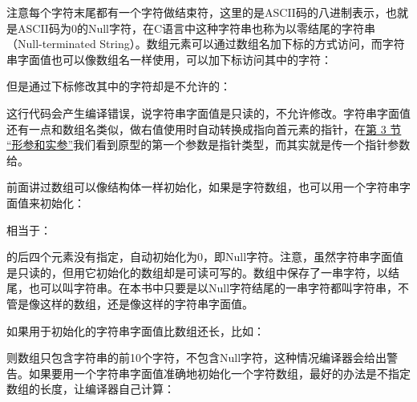

注意每个字符末尾都有一个字符做结束符，这里的是ASCII码的八进制表示，也就是ASCII码为0的Null字符，在C语言中这种字符串也称为以零结尾的字符串（Null-terminated String）。数组元素可以通过数组名加下标的方式访问，而字符串字面值也可以像数组名一样使用，可以加下标访问其中的字符：




但是通过下标修改其中的字符却是不允许的：




这行代码会产生编译错误，说字符串字面值是只读的，不允许修改。字符串字面值还有一点和数组名类似，做右值使用时自动转换成指向首元素的指针，在\hyperlink{db.ch03s03.id2713785}{第 3 节 “形参和实参”}我们看到原型的第一个参数是指针类型，而其实就是传一个指针参数给。



前面讲过数组可以像结构体一样初始化，如果是字符数组，也可以用一个字符串字面值来初始化：




相当于：




的后四个元素没有指定，自动初始化为0，即Null字符。注意，虽然字符串字面值是只读的，但用它初始化的数组却是可读可写的。数组中保存了一串字符，以结尾，也可以叫字符串。在本书中只要是以Null字符结尾的一串字符都叫字符串，不管是像这样的数组，还是像这样的字符串字面值。



如果用于初始化的字符串字面值比数组还长，比如：




则数组只包含字符串的前10个字符，不包含Null字符，这种情况编译器会给出警告。如果要用一个字符串字面值准确地初始化一个字符数组，最好的办法是不指定数组的长度，让编译器自己计算：




